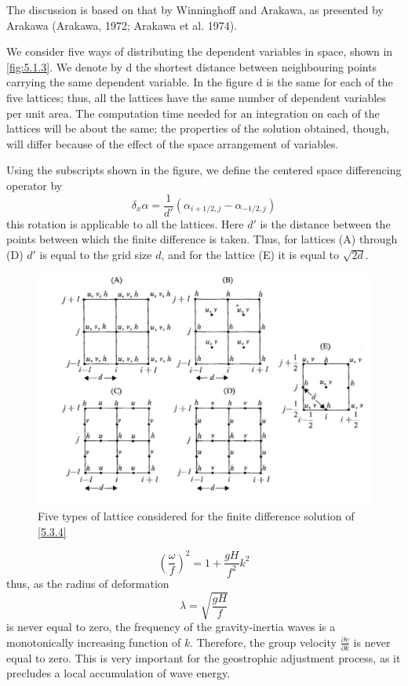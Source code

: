 The discussion is based on that by Winninghoff and Arakawa, as presented by Arakawa (Arakawa, 1972; Arakawa et al. 1974).

We consider five ways of distributing the dependent variables in space, shown in \ref{fig:5.1.3}. We denote by d the shortest distance between neighbouring points carrying the same dependent variable. In the figure d is the same for each of the five lattices; thus, all the lattices have the same number of dependent variables per unit area. The computation time needed for an integration on each of the lattices will be about the same; the properties of the solution obtained, though, will differ because of the effect of the space arrangement of variables.

Using the subscripts shown in the figure, we define the centered space differencing operator by
\begin{equation}
	\delta_x\alpha=\frac{1}{d'}\left(\alpha_{i+1/2, j}-\alpha_{-1/2,j}\right)
\end{equation}
this rotation is applicable to all the lattices. Here $d'$ is the distance between the points between which the finite difference is taken. Thus, for lattices (A) through (D) $d'$ is equal to the grid size $d$, and for the lattice (E) it is equal to $\sqrt{2d}$.\begin{figure}[h]
	\centering
	\includegraphics[width=0.5\linewidth]{uploads/Screenshot 2024-11-14 122636.png}
	\caption{Five types of lattice considered for the finite difference solution of \ref{5.3.4}}
	\label{fig:5.3.1}
\end{figure}
\begin{equation}\label{5.3.11}
	\left(\frac{\omega}{f}\right)^2=1+\frac{gH}{f^2}k^2
\end{equation}
thus, as the radius of deformation $$\lambda=\sqrt{\frac{gH}{f}}$$ is never equal to zero, the frequency of the gravity-inertia waves is a monotonically increasing function of $k$. Therefore, the group velocity $\frac{\partial v}{\partial k}$ is never equal to zero. This is very important for the geostrophic adjustment process, as it precludes a local accumulation of wave energy.

